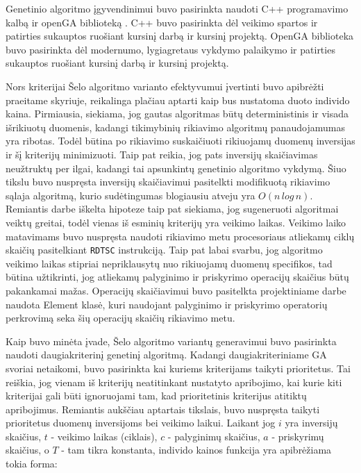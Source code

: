 \documentclass{VUMIFInfBakalaurinis}
\begin{document}
Genetinio algoritmo įgyvendinimui buvo pasirinkta naudoti C++ programavimo kalbą ir openGA biblioteką \cite{mohammadi2017openga}.
C++ buvo pasirinkta dėl veikimo spartos ir patirties sukauptos ruošiant kursinį darbą ir kursinį projektą.
OpenGA biblioteka buvo pasirinkta dėl modernumo, lygiagretaus vykdymo palaikymo ir patirties sukauptos ruošiant kursinį darbą ir kursinį projektą.

Nors kriterijai Šelo algoritmo varianto efektyvumui įvertinti buvo apibrėžti praeitame skyriuje,
reikalinga plačiau aptarti kaip bus nustatoma duoto individo kaina.
Pirmiausia, siekiama, jog gautas algoritmas būtų deterministinis ir visada išrikiuotų duomenis, kadangi tikimybinių rikiavimo algoritmų panaudojamumas yra ribotas.
Todėl būtina po rikiavimo suskaičiuoti rikiuojamų duomenų inversijas ir šį kriterijų minimizuoti.
Taip pat reikia, jog pats inversijų skaičiavimas neužtruktų per ilgai, kadangi tai apsunkintų genetinio algoritmo vykdymą.
Šiuo tikslu buvo nuspręsta inversijų skaičiavimui pasitelkti modifikuotą rikiavimo sąlaja algoritmą, kurio sudėtingumas blogiausiu atveju yra $O(n\,log\,n)$.
Remiantis darbe iškelta hipoteze taip pat siekiama, jog sugeneruoti algoritmai veiktų greitai, todėl
vienas iš esminių kriterijų yra veikimo laikas.
Veikimo laiko matavimams buvo nuspręsta naudoti rikiavimo metu procesoriaus atliekamų ciklų skaičių pasitelkiant \verb|RDTSC| instrukciją.
Taip pat labai svarbu, jog algoritmo veikimo laikas stipriai nepriklausytų nuo rikiuojamų duomenų specifikos, tad 
būtina užtikrinti, jog atliekamų palyginimo ir priskyrimo operacijų skaičius būtų pakankamai mažas.
Operacijų skaičiavimui buvo pasitelkta projektiniame darbe naudota Element klasė, kuri naudojant palyginimo ir priskyrimo operatorių
perkrovimą seka šių operacijų skaičių rikiavimo metu.

Kaip buvo minėta įvade, Šelo algoritmo variantų generavimui buvo pasirinkta naudoti daugiakriterinį genetinį algoritmą.
Kadangi daugiakriteriniame GA svoriai netaikomi, buvo pasirinkta kai kuriems kriterijams taikyti prioritetus.
Tai reiškia, jog vienam iš kriterijų neatitinkant nustatyto apribojimo, kai kurie kiti kriterijai gali būti ignoruojami
tam, kad prioritetinis kriterijus atitiktų apribojimus.
Remiantis aukščiau aptartais tikslais, buvo nuspręsta taikyti prioritetus duomenų inversijoms bei veikimo laikui.
Laikant jog $i$ yra inversijų skaičius, $t$ - veikimo laikas (ciklais),
$c$ - palyginimų skaičius, $a$ - priskyrimų skaičius, o $T$ - tam tikra konstanta,
individo kainos funkcija yra apibrėžiama tokia forma:
\end{document}
